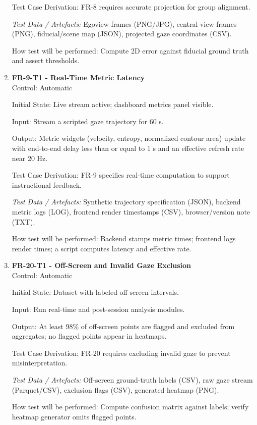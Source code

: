 \documentclass[12pt, titlepage]{article}
\begin{document}
\begin{enumerate}
Test Case Derivation: FR-8 requires accurate projection for group alignment.

\textit{Test Data / Artefacts:} Egoview frames (PNG/JPG), central-view frames (PNG), fiducial/scene map (JSON), projected gaze coordinates (CSV).

How test will be performed: Compute 2D error against fiducial ground truth and assert thresholds.

\item \textbf{FR-9-T1 - Real-Time Metric Latency} \\

Control: Automatic

Initial State: Live stream active; dashboard metrics panel visible.

Input: Stream a scripted gaze trajectory for 60 s.

Output: Metric widgets (velocity, entropy, normalized contour area) update with end-to-end delay less than or equal to 1 s and an effective refresh rate near 20 Hz.

Test Case Derivation: FR-9 specifies real-time computation to support instructional feedback.

\textit{Test Data / Artefacts:} Synthetic trajectory specification (JSON), backend metric logs (LOG), frontend render timestamps (CSV), browser/version note (TXT).

How test will be performed: Backend stamps metric times; frontend logs render times; a script computes latency and effective rate.

\item \textbf{FR-20-T1 - Off-Screen and Invalid Gaze Exclusion} \\

Control: Automatic

Initial State: Dataset with labeled off-screen intervals.

Input: Run real-time and post-session analysis modules.

Output: At least 98\% of off-screen points are flagged and excluded from aggregates; no flagged points appear in heatmaps.

Test Case Derivation: FR-20 requires excluding invalid gaze to prevent misinterpretation.

\textit{Test Data / Artefacts:} Off-screen ground-truth labels (CSV), raw gaze stream (Parquet/CSV), exclusion flags (CSV), generated heatmap (PNG).

How test will be performed: Compute confusion matrix against labels; verify heatmap generator omits flagged points.


\end{enumerate}
\end{document}
